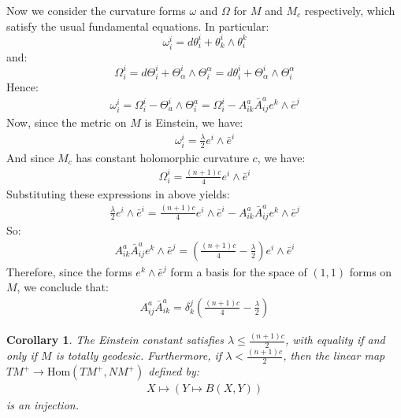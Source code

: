 \documentclass[11pt]{amsart}
\newtheorem{cor}[subsection]{Corollary}
\theoremstyle{definition}
\def \Hom{ \text{Hom} }
\def \TMp{ TM^{+} }
\def \NMp{ NM^+ }
\begin{document}
Now we consider the curvature forms $\omega$ and $\Omega$ for $M$ and $M_c$ respectively, which satisfy the usual fundamental equations.  In particular:
%
$$\omega^i_i = d \theta^i_i + \theta^i_k \wedge \theta^k_i$$ 
%
and:
%
$$\Omega^i_i = d \Theta^i_i + \Theta^i_{\alpha} \wedge \Theta^{\alpha}_i = d \theta^i_i + \Theta^i_{\alpha} \wedge \Theta^{\alpha}_i$$
%
Hence:
%
\begin{align*}
\omega^i_i = \Omega^i_i - \Theta^i_a \wedge \Theta^a_i = \Omega^i_i - A^a_{ik} \bar{A}^a_{ij} e^k \wedge \bar{e}^j
\end{align*}
%
Now, since the metric on $M$ is Einstein, we have:
%
\begin{align*}
\omega^i_i = \frac{\lambda}{2} e^i \wedge \bar{e}^i
\end{align*}
%
And since $M_c$ has constant holomorphic curvature $c$, we have:
%
\begin{align*}
\Omega^i_i = \frac{(n+1)c}{4} e^i \wedge \bar{e}^i
\end{align*}
%
Substituting these expressions in above yields:
%
\begin{align*}
\frac{\lambda}{2} e^i \wedge \bar{e}^i = \frac{(n+1)c}{4} e^i \wedge \bar{e}^i - A^a_{ik} \bar{A}^a_{ij} e^k \wedge \bar{e}^j
\end{align*}
%
So:
%
\begin{align*}
A^a_{ik} \bar{A}^a_{ij} e^k \wedge \bar{e}^j = \left( \frac{(n+1)c}{4} - \frac{\lambda}{2} \right) e^i \wedge \bar{e}^i
\end{align*}
%
Therefore, since the forms $e^k \wedge \bar{e}^j$ form a basis for the space of $(1,1)$ forms on $M$, we conclude that:
%
\begin{align}
A^a_{ij} \bar{A}^a_{ik} = \delta^j_k \left( \frac{(n+1)c}{4} - \frac{\lambda}{2} \right)
\end{align}

\begin{cor}  The Einstein constant satisfies $\lambda \leq \frac{(n+1)c}{2}$, with equality if and only if $M$ is totally geodesic.  Furthermore, if $\lambda < \frac{(n+1)c}{2}$, then the linear map $\TMp \rightarrow \Hom ( \TMp, \NMp )$ defined by:
%
\begin{align*}
X \mapsto ( Y \mapsto B(X, Y) )
\end{align*}
%
is an injection.
%
\end{cor}
\end{document}
